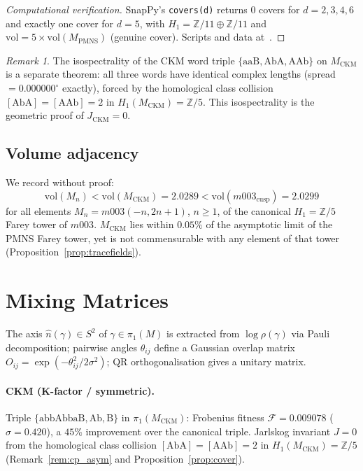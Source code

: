 \documentclass[11pt,a4paper]{article}
\theoremstyle{definition}
\theoremstyle{remark}
\newtheorem{remark}[theorem]{Remark}
\newcommand{\ZZ}{\mathbb{Z}}
\newcommand{\MPMNS}{M_{\mathrm{PMNS}}}
\newcommand{\MCKM}{M_{\mathrm{CKM}}}
\begin{document}
\begin{proof}[Computational verification]
SnapPy's \texttt{covers(d)} returns 0 covers for $d=2,3,4,6$
and exactly one cover for $d=5$, with
$H_1 = \ZZ/11\oplus\ZZ/11$ and
$\mathrm{vol} = 5\times\mathrm{vol}(\MPMNS)$ (genuine cover).
Scripts and data at~\cite{GitHub}.
\end{proof}

\begin{remark}
The isospectrality of the CKM word triple
$\{\mathrm{aaB},\mathrm{AbA},\mathrm{AAb}\}$ on $\MCKM$ is a
separate theorem: all three words have identical complex lengths
(spread $= 0.000000^\circ$ exactly), forced by the homological
class collision $[\mathrm{AbA}]=[\mathrm{AAb}]=2$ in
$H_1(\MCKM)=\ZZ/5$.
This isospectrality is the geometric proof of $J_\mathrm{CKM}=0$.
\end{remark}

\subsection{Volume adjacency}

We record without proof:
\[
  \mathrm{vol}(M_n) < \mathrm{vol}(\MCKM) = 2.0289
  < \mathrm{vol}(m003_\mathrm{cusp}) = 2.0299
\]
for all elements $M_n = m003(-n,2n+1)$, $n\geq1$, of the
canonical $H_1=\ZZ/5$ Farey tower of $m003$.
$\MCKM$ lies within $0.05\%$ of the asymptotic limit of the
PMNS Farey tower, yet is not commensurable with any element
of that tower (Proposition~\ref{prop:tracefields}).

\section{Mixing Matrices}
\label{sec:mixing}

The axis $\hat{n}(\gamma)\in S^2$ of $\gamma\in\pi_1(M)$
is extracted from $\log\rho(\gamma)$ via Pauli decomposition;
pairwise angles $\theta_{ij}$ define a Gaussian overlap matrix
$O_{ij}=\exp(-\theta_{ij}^2/2\sigma^2)$;
QR orthogonalisation gives a unitary matrix.

\paragraph{CKM (K-factor / symmetric).}
Triple $\{\mathrm{abbAbbaB},\mathrm{Ab},\mathrm{B}\}$
in $\pi_1(\MCKM)$:
Frobenius fitness $\mathcal{F}=0.009078$ ($\sigma=0.420$),
a $45\%$ improvement over the canonical triple.
Jarlskog invariant $J=0$ from the homological class collision
$[\mathrm{AbA}]=[\mathrm{AAb}]=2$ in $H_1(\MCKM)=\ZZ/5$
(Remark~\ref{rem:cp_asym} and Proposition~\ref{prop:cover}).
\end{document}
